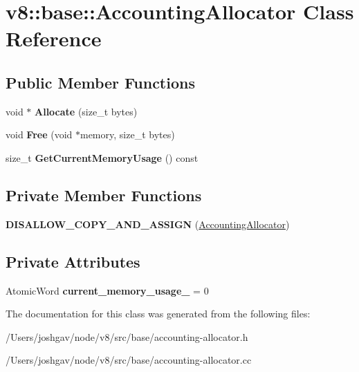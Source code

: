 \hypertarget{classv8_1_1base_1_1_accounting_allocator}{}\section{v8\+:\+:base\+:\+:Accounting\+Allocator Class Reference}
\label{classv8_1_1base_1_1_accounting_allocator}
\subsection*{Public Member Functions}
\begin{DoxyCompactItemize}
\item 
void $\ast$ {\bfseries Allocate} (size\+\_\+t bytes)\hypertarget{classv8_1_1base_1_1_accounting_allocator_a404780a6834e17311df8a2f000ceed7e}{}\label{classv8_1_1base_1_1_accounting_allocator_a404780a6834e17311df8a2f000ceed7e}

\item 
void {\bfseries Free} (void $\ast$memory, size\+\_\+t bytes)\hypertarget{classv8_1_1base_1_1_accounting_allocator_a0c565703354789bd498b41ba7dfa5b7c}{}\label{classv8_1_1base_1_1_accounting_allocator_a0c565703354789bd498b41ba7dfa5b7c}

\item 
size\+\_\+t {\bfseries Get\+Current\+Memory\+Usage} () const \hypertarget{classv8_1_1base_1_1_accounting_allocator_ab9d7491c6011fd2c5bb90ea4a0f2fe78}{}\label{classv8_1_1base_1_1_accounting_allocator_ab9d7491c6011fd2c5bb90ea4a0f2fe78}

\end{DoxyCompactItemize}
\subsection*{Private Member Functions}
\begin{DoxyCompactItemize}
\item 
{\bfseries D\+I\+S\+A\+L\+L\+O\+W\+\_\+\+C\+O\+P\+Y\+\_\+\+A\+N\+D\+\_\+\+A\+S\+S\+I\+GN} (\hyperlink{classv8_1_1base_1_1_accounting_allocator}{Accounting\+Allocator})\hypertarget{classv8_1_1base_1_1_accounting_allocator_a4d74238f0929f80468ffeef862113cb9}{}\label{classv8_1_1base_1_1_accounting_allocator_a4d74238f0929f80468ffeef862113cb9}

\end{DoxyCompactItemize}
\subsection*{Private Attributes}
\begin{DoxyCompactItemize}
\item 
Atomic\+Word {\bfseries current\+\_\+memory\+\_\+usage\+\_\+} = 0\hypertarget{classv8_1_1base_1_1_accounting_allocator_a445a2bfa4ae01aadf4f4dd5367598092}{}\label{classv8_1_1base_1_1_accounting_allocator_a445a2bfa4ae01aadf4f4dd5367598092}

\end{DoxyCompactItemize}


The documentation for this class was generated from the following files\+:\begin{DoxyCompactItemize}
\item 
/\+Users/joshgav/node/v8/src/base/accounting-\/allocator.\+h\item 
/\+Users/joshgav/node/v8/src/base/accounting-\/allocator.\+cc\end{DoxyCompactItemize}
